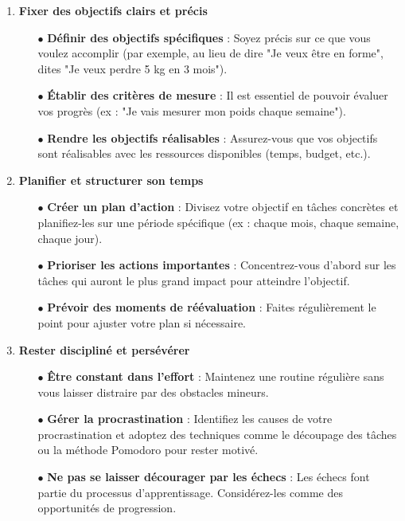 \documentclass[a4paper,12pt]{article} %
\begin{document}
\begin{enumerate}[label=\textbf{\arabic*.}]  %

    \item \textbf{Fixer des objectifs clairs et précis}
    \begin{itemize}  %
        \item[$\bullet$]\textbf{Définir des objectifs spécifiques} : Soyez précis sur ce que vous voulez accomplir (par exemple, au lieu de dire "Je veux être en forme", dites "Je veux perdre 5 kg en 3 mois").
        \item[$\bullet$] \textbf{Établir des critères de mesure} : Il est essentiel de pouvoir évaluer vos progrès (ex : "Je vais mesurer mon poids chaque semaine").
        \item[$\bullet$] \textbf{Rendre les objectifs réalisables} : Assurez-vous que vos objectifs sont réalisables avec les ressources disponibles (temps, budget, etc.).
    \end{itemize}

    \item \textbf{Planifier et structurer son temps}
    \begin{itemize}
        \item[$\bullet$]\textbf{Créer un plan d'action} : Divisez votre objectif en tâches concrètes et planifiez-les sur une période spécifique (ex : chaque mois, chaque semaine, chaque jour).
        \item[$\bullet$]\textbf{Prioriser les actions importantes} : Concentrez-vous d'abord sur les tâches qui auront le plus grand impact pour atteindre l'objectif.
        \item [$\bullet$]\textbf{Prévoir des moments de réévaluation} : Faites régulièrement le point pour ajuster votre plan si nécessaire.
    \end{itemize}

    \item \textbf{Rester discipliné et persévérer}
    \begin{itemize}
        \item [$\bullet$]\textbf{Être constant dans l'effort} : Maintenez une routine régulière sans vous laisser distraire par des obstacles mineurs.
        \item [$\bullet$]\textbf{Gérer la procrastination} : Identifiez les causes de votre procrastination et adoptez des techniques comme le découpage des tâches ou la méthode Pomodoro pour rester motivé.
        \item[$\bullet$] \textbf{Ne pas se laisser décourager par les échecs} : Les échecs font partie du processus d'apprentissage. Considérez-les comme des opportunités de progression.
    \end{itemize}


\end{enumerate}
\end{document}
